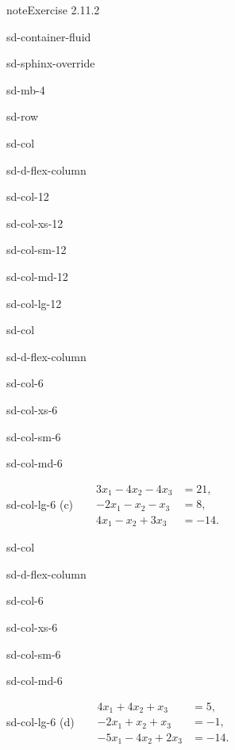 \documentclass[letterpaper,10pt,english]{jupyterBook}
\begin{document}
\begin{sphinxadmonition}{note}{Exercise 2.11.2}
\begin{sphinxuseclass}{sd-container-fluid}
\begin{sphinxuseclass}{sd-sphinx-override}
\begin{sphinxuseclass}{sd-mb-4}
\begin{sphinxuseclass}{sd-row}
\begin{sphinxuseclass}{sd-col}
\begin{sphinxuseclass}{sd-d-flex-column}
\begin{sphinxuseclass}{sd-col-12}
\begin{sphinxuseclass}{sd-col-xs-12}
\begin{sphinxuseclass}{sd-col-sm-12}
\begin{sphinxuseclass}{sd-col-md-12}
\begin{sphinxuseclass}{sd-col-lg-12}
\end{sphinxuseclass}
\end{sphinxuseclass}
\end{sphinxuseclass}
\end{sphinxuseclass}
\end{sphinxuseclass}
\end{sphinxuseclass}
\end{sphinxuseclass}
\begin{sphinxuseclass}{sd-col}
\begin{sphinxuseclass}{sd-d-flex-column}
\begin{sphinxuseclass}{sd-col-6}
\begin{sphinxuseclass}{sd-col-xs-6}
\begin{sphinxuseclass}{sd-col-sm-6}
\begin{sphinxuseclass}{sd-col-md-6}
\begin{sphinxuseclass}{sd-col-lg-6}
\sphinxAtStartPar
(c)  
\( \begin{align*}
     3 x_{1} - 4 x_{2} - 4 x_{3} &= 21, \\
     - 2 x_{1} -  x_{2} -  x_{3} &= 8, \\
     4 x_{1} -  x_{2} + 3 x_{3} &= -14.
\end{align*} \)

\end{sphinxuseclass}
\end{sphinxuseclass}
\end{sphinxuseclass}
\end{sphinxuseclass}
\end{sphinxuseclass}
\end{sphinxuseclass}
\end{sphinxuseclass}
\begin{sphinxuseclass}{sd-col}
\begin{sphinxuseclass}{sd-d-flex-column}
\begin{sphinxuseclass}{sd-col-6}
\begin{sphinxuseclass}{sd-col-xs-6}
\begin{sphinxuseclass}{sd-col-sm-6}
\begin{sphinxuseclass}{sd-col-md-6}
\begin{sphinxuseclass}{sd-col-lg-6}
\sphinxAtStartPar
(d)   
\( \begin{align*}
     4 x_{1} + 4 x_{2} +  x_{3} &= 5, \\
     - 2 x_{1} +  x_{2} +  x_{3} &= -1, \\
     - 5 x_{1} - 4 x_{2} + 2 x_{3} &= -14.
\end{align*} \)


\end{sphinxuseclass}
\end{sphinxuseclass}
\end{sphinxuseclass}
\end{sphinxuseclass}
\end{sphinxuseclass}
\end{sphinxuseclass}
\end{sphinxuseclass}
\end{sphinxuseclass}
\end{sphinxuseclass}
\end{sphinxuseclass}
\end{sphinxuseclass}
\end{sphinxadmonition}
\end{document}

